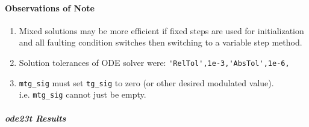 \documentclass[12pt]{article}
\begin{document}
\begin{table}[!ht]
\end{table}

\paragraph{Observations of Note}
\begin{enumerate}[resume]
\item Mixed solutions may be more efficient if fixed steps are used for initialization and all faulting condition switches then switching to a variable step method.
\item Solution tolerances of ODE solver were: \verb|'RelTol',1e-3,'AbsTol',1e-6,|
\item \verb|mtg_sig| must set \verb|tg_sig| to zero (or other desired modulated value). \\i.e. \verb|mtg_sig| cannot just be empty.

\end{enumerate}


\pagebreak

 

\subparagraph{ode23t Results} \ \\
\end{document}
